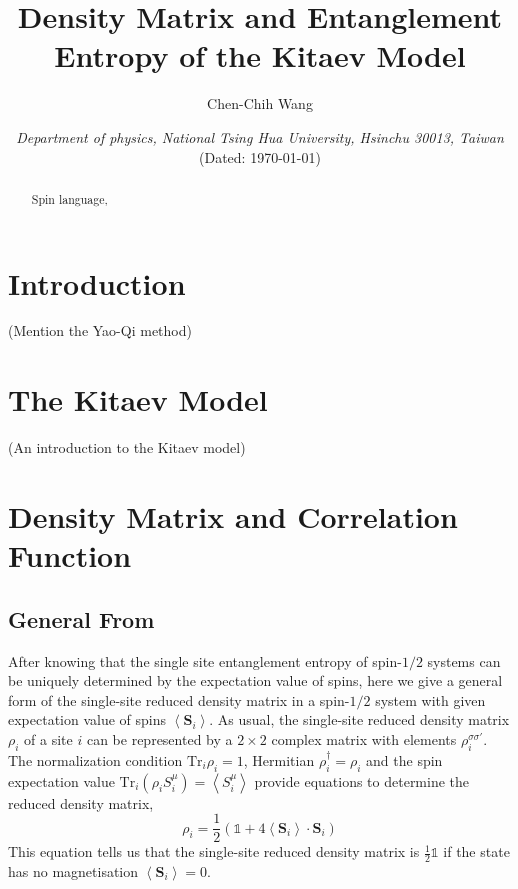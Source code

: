 \documentclass[12font]{article}
\title{\textbf{ Density Matrix and Entanglement Entropy of the Kitaev Model }}
\author{Chen-Chih Wang  }
\date{\textit{Department of physics, National Tsing Hua University, Hsinchu 30013, Taiwan} \\ (Dated: \today)}
\theoremstyle{definition}
\numberwithin{equation}{section}
\newcommand{\anglelr}[1]{\left\langle #1 \right\rangle}
\newcommand{\lr}[1]{\left(  #1  \right)}
\newcommand{\mrm}[1]{\mathrm{#1}}
\newcommand{\bo}[1]{\mathbf{#1}}
\newcommand{\alert}[1]{{\color{red}#1}}
\newcommand{\Tr}{\mrm{Tr}}
\begin{document}
\renewcommand\qedsymbol{$\blacksquare$}
\maketitle
\begin{abstract}
  Spin language,
\end{abstract}

\section{Introduction}
\alert{(Mention the Yao-Qi method)}

\section{The Kitaev Model}
\alert{(An introduction to the Kitaev model)}

\section{Density Matrix and Correlation Function}

\subsection{General From}
After knowing that the single site entanglement entropy of spin-$1/2$ systems can be uniquely determined by the expectation value of spins, here we give a general form of the single-site reduced density matrix in a spin-$1/2$ system with given expectation value of spins $\anglelr{\bo{S}_i}$. As usual, the single-site reduced density matrix $\rho_i$ of a site $i$ can be represented by a $2\times 2$ complex matrix with elements $\rho_i^{\sigma\sigma'}$. The normalization condition $\Tr_i\rho_i = 1$, Hermitian $\rho_i^\dagger = \rho_i$ and the spin expectation value $\Tr_i\lr{\rho_i S^\mu_i} = \anglelr{S^\mu_i}$ provide equations to determine the reduced density matrix,
\begin{equation}\label{GeneralSingleSiteDM.e}
  \rho_i = \frac{1}{2}\lr{\mathds{1} + 4\anglelr{\bo{S}_i}\cdot\bo{S}_i}
\end{equation}
This equation tells us that the single-site reduced density matrix is $\frac{1}{2}\mathds{1}$ if the state has no magnetisation $\anglelr{\bo{S}_i} = 0$. 
\end{document}
